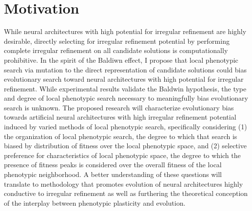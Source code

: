 \section{Motivation}

While neural architectures with high potential for irregular refinement are highly desirable, directly selecting for irregular refinement potential by performing complete irregular refinement on all candidate solutions is computationally prohibitive.
In the spirit of the Baldiwn effect, I propose that local phenotypic search via mutation to the direct representation of candidate solutions could bias evolutionary search toward neural architectures with high potential for irregular refinement.
While experimental results validate the Baldwin hypothesis,\autocite{Downing2009ComputationalEffect} the type and degree of local phenotypic search necessary to meaningfully bias evolutionary search is unknown.
The proposed research will characterize evolutionary bias towards artificial neural architectures with high irregular refinement potential induced by varied methods of local phenotypic search, specifically considering (1) the organization of local phenotypic search, the degree to which that search is biased by distribution of fitness over the local phenotypic space, and (2) selective preference for characteristics of local phenotypic space, the degree to which the presence of fitness peaks is considered over the overall fitness of the local phenotypic neighborhood.
A better understanding of these questions will translate to methodology that promotes evolution of neural architectures highly conductive to irregular refinement as well as furthering the theoretical conception of the interplay between phenotypic plasticity and evolution.
 
